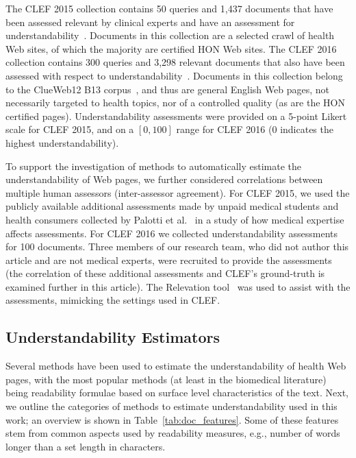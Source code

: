 \documentclass[10pt,a4paper]{article}
\begin{document}
The CLEF 2015 collection contains 50 queries and 1,437 documents that have been assessed relevant by clinical experts and have an assessment for understandability~\cite{clef15}. Documents in this collection are a selected crawl of health Web sites, of which the majority are certified HON Web sites.
The CLEF 2016 collection contains 300 queries and 3,298 relevant documents that also have been assessed with respect to understandability~\cite{clef16}. Documents in this collection belong to the ClueWeb12 B13 corpus~\cite{clueweb12}, and thus are general English Web pages, not necessarily targeted to health topics, nor of a controlled quality (as are the HON certified pages). 
Understandability assessments were provided on a 5-point Likert scale for CLEF 2015, and on a $[0,100]$ range for CLEF 2016 (0 indicates the highest understandability). 

To support the investigation of methods to automatically estimate the understandability of Web pages, 
we further considered correlations between multiple human assessors (inter-assessor agreement). For CLEF 2015, we used the publicly available additional assessments made by unpaid medical students and health consumers collected by Palotti et al.~\cite{palotti16b} in a study of how medical expertise affects assessments. For CLEF 2016 we  collected understandability assessments for 100 documents. 
Three members of our research team, who did not author this article and are not medical experts, were recruited to provide the assessments (the correlation of these additional assessments and CLEF's ground-truth is examined further in this article).
The Relevation tool~\cite{koopman14} was used to assist with the assessments, mimicking the settings used in CLEF. 


\subsection*{Understandability Estimators}
\label{sec:proxies}

Several methods have been used to estimate the understandability of health Web pages, with the most popular methods (at least in the biomedical literature) being readability formulae based on surface level characteristics of the text. Next, we outline the categories of methods to estimate understandability used in this work; an overview is shown in Table~\ref{tab:doc_features}. Some of these features stem from common aspects used by readability measures, e.g., number of words longer than a set length in characters.
\end{document}
